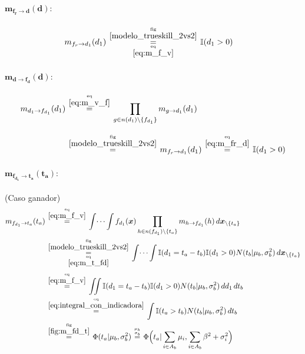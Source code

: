\documentclass[article]{jss}
\newcommand\hfrac[2]{\genfrac{}{}{0pt}{}{#1}{#2}} %
\begin{document}
\begin{appendix}
\paragraph{$\bm{m_{f_r \rightarrow d}(d)}:$}

\begin{equation}\label{eq:m_fr_d}
\begin{split}
m_{f_r \rightarrow d_1}(d_1) & \overset{\hfrac{\text{fig}}{\ref{modelo_trueskill_2vs2}}}{\underset{\hfrac{\text{eq}}{\ref{eq:m_f_v}}}{=}} \mathbb{I}(d_1 > 0)
\end{split}
\end{equation}


\paragraph{$\bm{m_{d \rightarrow f_d}(d)}:$}
\begin{equation}\label{eq:m_d_fd}
\begin{split}
m_{d_1 \rightarrow f_{d_1}}(d_1) & \overset{\hfrac{\text{eq}}{\ref{eq:m_v_f}}}{=} \prod_{g \in n(d_1) \setminus  \{f_{d_1} \}} m_{g \rightarrow d_1} (d_1) \\[0.3cm] 
 & \overset{\hfrac{\text{fig}}{\ref{modelo_trueskill_2vs2}}}{=} m_{f_r \rightarrow d_1}(d_1) \overset{\hfrac{\text{eq}}{\ref{eq:m_fr_d}}}{=} \mathbb{I}(d_1 > 0)
\end{split}
\end{equation}

\paragraph{$\bm{m_{f_{d_1} \rightarrow t_a}(t_a)}:$} (Caso ganador)
\begin{equation}\label{eq:m_fd_ta}
\begin{split}
m_{f_{d_1} \rightarrow t_a}(t_a) & \overset{\hfrac{\text{eq}}{\ref{eq:m_f_v}}}{=} \int \dots \int f_{d_1}(\bm{x}) \prod_{h \in n(f_{d_1}) \setminus \{t_a\} } m_{h \rightarrow f_{d_1}}(h) \, d\bm{x}_{\setminus \{t_a\} }  \\
&\overset{\hfrac{\text{fig}}{\ref{modelo_trueskill_2vs2}}}{\underset{\hfrac{\text{eq}}{\ref{eq:m_t_fd}}}{=}}  \int \dots \int \mathbb{I}(d_1 = t_a - t_b) \mathbb{I}(d_1 > 0) N(t_b | \mu_b , \sigma_b^2 )  \, d\bm{x}_{\setminus \{t_a\} } \\[0.1cm]
& \overset{\hfrac{\text{eq}}{\ref{eq:m_f_v}}}{=} \iint \mathbb{I}(d_1 = t_a - t_b) \mathbb{I}(d_1 > 0) N(t_b | \mu_b , \sigma_b^2 ) \, dd_1\,dt_b \\
& \overset{\hfrac{\text{eq}}{\ref{eq:integral_con_indicadora}}}{=} \int \mathbb{I}( t_a > t_b)  N(t_b | \mu_b , \sigma_b^2 ) \,dt_b  \\
& \overset{\hfrac{\text{fig}}{\ref{fig:m_fd_t}}}{=} \Phi (t_a| \mu_b, \sigma_b^2)  \overset{\hfrac{\mu_b}{\sigma_b}}{=}  \Phi \Big(t_a| \sum_{i \in A_b} \mu_i , \sum_{i \in A_b} \beta^2 + \sigma_i^2 \Big)
\end{split}
\end{equation}


\end{appendix}
\end{document}
